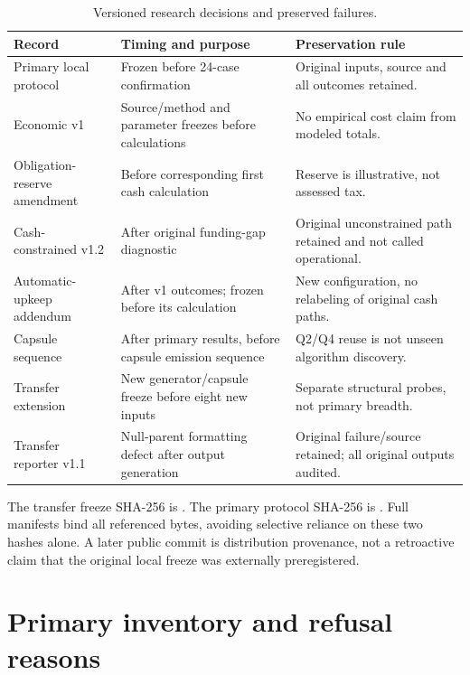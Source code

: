 \begin{table}[htbp]\centering\small
\caption{Versioned research decisions and preserved failures.}\label{tab:amendments}
\begin{tabularx}{\linewidth}{@{}lXX@{}}\toprule
Record & Timing and purpose & Preservation rule\\\midrule
Primary local protocol & Frozen before 24-case confirmation & Original inputs, source and all outcomes retained.\\
Economic v1 & Source/method and parameter freezes before calculations & No empirical cost claim from modeled totals.\\
Obligation-reserve amendment & Before corresponding first cash calculation & Reserve is illustrative, not assessed tax.\\
Cash-constrained v1.2 & After original funding-gap diagnostic & Original unconstrained path retained and not called operational.\\
Automatic-upkeep addendum & After v1 outcomes; frozen before its calculation & New configuration, no relabeling of original cash paths.\\
Capsule sequence & After primary results, before capsule emission sequence & Q2/Q4 reuse is not unseen algorithm discovery.\\
Transfer extension & New generator/capsule freeze before eight new inputs & Separate structural probes, not primary breadth.\\
Transfer reporter v1.1 & Null-parent formatting defect after output generation & Original failure/source retained; all original outputs audited.\\\bottomrule
\end{tabularx}
\end{table}

The transfer freeze SHA-256 is . The primary protocol SHA-256 is . Full manifests bind all referenced bytes, avoiding selective reliance on these two hashes alone. A later public commit is distribution provenance, not a retroactive claim that the original local freeze was externally preregistered.

\FloatBarrier
\section{Primary inventory and refusal reasons}

